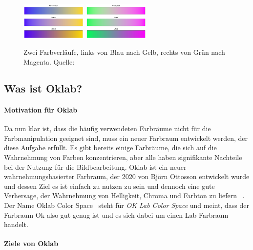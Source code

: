 \documentclass[12pt, a4paper, ngerman]{article}
\begin{document}
\begin{figure}
  \centering
  \includegraphics[width=0.29\textwidth]{Grafiken/Farbverlauf/blueyellow.png}
  \includegraphics[width=0.29\textwidth]{Grafiken/Farbverlauf/greenmagenta.png}
  \caption{Zwei Farbverläufe, links von Blau nach Gelb, rechts von Grün nach Magenta. Quelle: ~\cite{Ottosson_2020}}
  \label{fig:vergleich_zweifarbig}
\end{figure}

\subsection{Was ist Oklab?}

\paragraph{Motivation für Oklab}
Da nun klar ist, dass die häufig verwendeten Farbräume nicht für die Farbmanipulation geeignet sind, 
muss ein neuer Farbraum entwickelt werden, der diese Aufgabe erfüllt.
Es gibt bereits einige Farbräume, die sich auf die Wahrnehmung von Farben konzentrieren, 
aber alle haben signifikante Nachteile bei der Nutzung für die Bildbearbeitung.
Oklab ist ein neuer wahrnehmungsbasierter Farbraum, der 2020 von Björn Ottosson entwickelt wurde und 
dessen Ziel es ist einfach zu nutzen zu sein und dennoch eine gute Verhersage, 
der  Wahrnehmung von Helligkeit, Chroma und Farbton zu liefern ~\cite{Oklab_2020}.
Der Name \glqq Oklab Color Space\grqq~ steht für \emph{OK Lab Color Space} und meint, 
dass der Farbraum Ok also gut genug ist und es sich dabei um einen Lab Farbraum handelt.

\paragraph{Ziele von Oklab}
\end{document}
